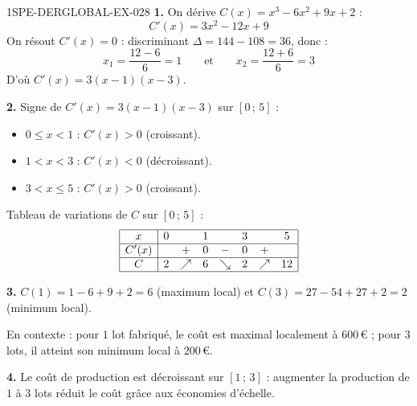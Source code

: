 \begin{corrige}{1SPE-DERGLOBAL-EX-028}
\textbf{1.} On dérive $C(x) = x^3 - 6x^2 + 9x + 2$ :
\[
C'(x) = 3x^2 - 12x + 9
\]
On résout $C'(x) = 0$ : discriminant $\Delta = 144 - 108 = 36$, donc :
\[
x_1 = \frac{12 - 6}{6} = 1 \qquad \text{et} \qquad x_2 = \frac{12 + 6}{6} = 3
\]
D'où $C'(x) = 3(x-1)(x-3)$.

\textbf{2.} Signe de $C'(x) = 3(x-1)(x-3)$ sur $[0\,;\,5]$ :
\begin{itemize}
\item $0 \leqslant x < 1$ : $C'(x) > 0$ (croissant).
\item $1 < x < 3$ : $C'(x) < 0$ (décroissant).
\item $3 < x \leqslant 5$ : $C'(x) > 0$ (croissant).
\end{itemize}

Tableau de variations de $C$ sur $[0\,;\,5]$ :
\[
\begin{array}{|c|ccccccc|}
\hline
x & 0 & & 1 & & 3 & & 5 \\
\hline
C'(x) & & + & 0 & - & 0 & + & \\
\hline
C & 2 & \nearrow & 6 & \searrow & 2 & \nearrow & 12 \\
\hline
\end{array}
\]

\textbf{3.} $C(1) = 1 - 6 + 9 + 2 = 6$ (maximum local) et $C(3) = 27 - 54 + 27 + 2 = 2$ (minimum local).

En contexte : pour $1$ lot fabriqué, le coût est maximal localement à $600\,\text{€}$ ; pour $3$ lots, il atteint son minimum local à $200\,\text{€}$.

\textbf{4.} Le coût de production est décroissant sur $[1\,;\,3]$ : augmenter la production de $1$ à $3$ lots réduit le coût grâce aux économies d'échelle.
\end{corrige}
